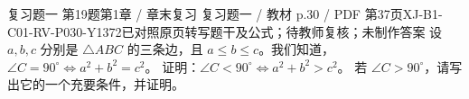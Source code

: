 \par\noindent\begin{minipage}{\linewidth}
\begin{bankitem}{复习题一 第19题}{第1章 / 章末复习 复习题一 / 教材 p.30 / PDF 第37页}{XJ-B1-C01-RV-P030-Y1372}{已对照原页转写题干及公式；待教师复核；未制作答案}
设 $a,b,c$ 分别是 $\triangle ABC$ 的三条边，且 $a\le b\le c$。我们知道，$\angle C=90^\circ\Leftrightarrow a^2+b^2=c^2$。
证明：$\angle C<90^\circ\Leftrightarrow a^2+b^2>c^2$。
若 $\angle C>90^\circ$，请写出它的一个充要条件，并证明。
\end{bankitem}
\end{minipage}\par\medskip
